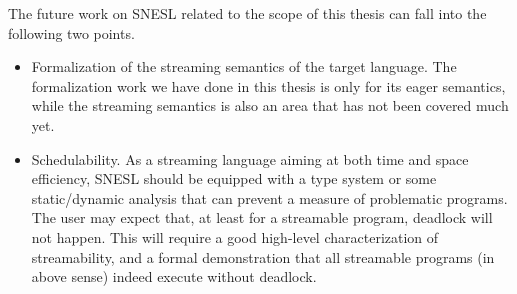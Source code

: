 The future work on SNESL related to the scope of this thesis can fall into the following two points.
\begin{itemize}
		\item Formalization of the streaming semantics of the target language. 
		The formalization work we have done in this thesis is only for its eager semantics, while the streaming semantics is also an area that has not been covered much yet.
		
	\item Schedulability.  As a streaming language aiming at both time and space efficiency,  SNESL should be equipped with a type system or some static/dynamic analysis that can prevent a measure of problematic programs. The user may expect that, at least for a streamable program, deadlock will not happen. This will require a good high-level characterization of streamability, and a formal demonstration that all streamable programs (in above sense) indeed execute without deadlock.
	

\end{itemize}

